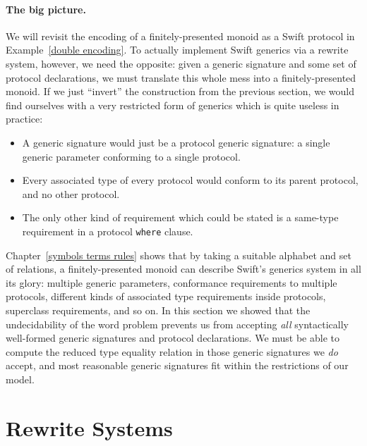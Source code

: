 \documentclass[../generics]{subfiles}
\begin{document}
\paragraph{The big picture.} We will revisit the encoding of a finitely-presented monoid as a Swift protocol in Example~\ref{double encoding}. To actually implement Swift generics via a rewrite system, however, we need the opposite: given a generic signature and some set of protocol declarations, we must translate this whole mess into a finitely-presented monoid. If we just ``invert'' the construction from the previous section, we would find ourselves with a very restricted form of generics which is quite useless in practice:
\begin{itemize}
\item A generic signature would just be a protocol generic signature: a single generic parameter conforming to a single protocol.
\item Every associated type of every protocol would conform to its parent protocol, and no other protocol.
\item The only other kind of requirement which could be stated is a same-type requirement in a protocol \texttt{where} clause.
\end{itemize}
Chapter~\ref{symbols terms rules} shows that by taking a suitable alphabet and set of relations, a finitely-presented monoid can describe Swift's generics system in all its glory: multiple generic parameters, conformance requirements to multiple protocols, different kinds of associated type requirements inside protocols, superclass requirements, and so on. In this section we showed that the undecidability of the word problem prevents us from accepting \emph{all} syntactically well-formed generic signatures and protocol declarations. We must be able to compute the reduced type equality relation in those generic signatures we \emph{do} accept, and most reasonable generic signatures fit within the restrictions of our model.

\section{Rewrite Systems}\label{rewritesystemintro}
\end{document}
